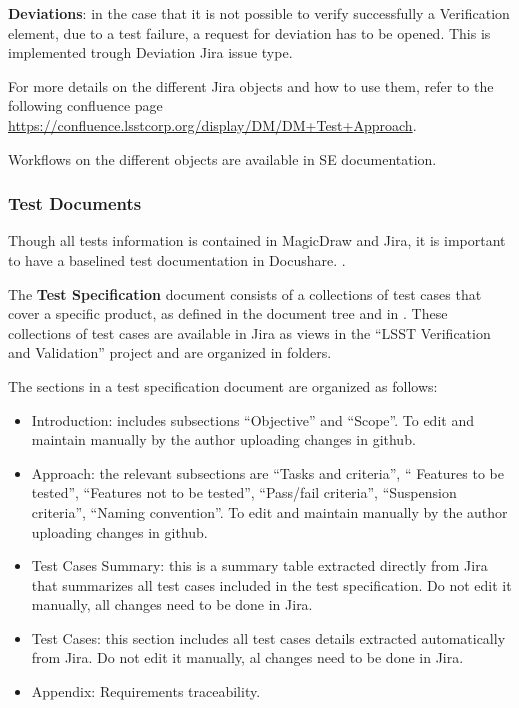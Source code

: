 {\bf Deviations}: in the case that it is not possible to verify successfully a Verification element, due to a test failure, a request for deviation has to be opened.
This is implemented trough Deviation Jira issue type.

For more details on the different Jira objects and how to use them, refer to the following confluence page
\url{https://confluence.lsstcorp.org/display/DM/DM+Test+Approach}.

Workflows on the different objects are available in SE documentation.


\subsubsection{Test Documents}

Though all tests information is contained in MagicDraw and Jira, it is important to have a  baselined test documentation in Docushare. .

The {\bf Test Specification} document consists of a collections of test cases that cover a specific \product{} product, as defined in the document tree and in .
These collections of test cases are available in Jira as views in the ``LSST Verification and Validation'' project and are organized in folders.

The sections in a test specification document are organized as follows:

\begin{itemize}
\item Introduction: includes subsections ``Objective'' and ``Scope''. To edit and maintain manually by the author uploading changes in github.
\item Approach: the relevant subsections are ``Tasks and criteria'', `` Features to be tested'', ``Features not to be tested'', ``Pass/fail criteria'', ``Suspension criteria'', ``Naming convention''. To edit and maintain manually by the author uploading changes in github.
\item Test Cases Summary: this is a summary table extracted directly from Jira that summarizes all test cases included in the test specification. Do not edit it manually, all changes need to be done in Jira.
\item Test Cases: this section includes all test cases details extracted automatically from Jira. Do not edit it manually, al changes need to be done in Jira.
\item Appendix: Requirements traceability.
\end{itemize}


